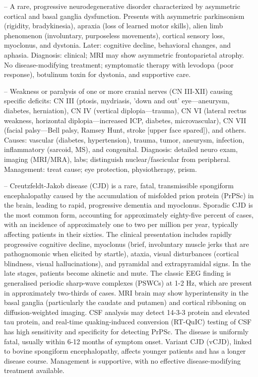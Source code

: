 -- A rare, progressive neurodegenerative disorder characterized by asymmetric cortical and basal ganglia dysfunction. Presents with asymmetric parkinsonism (rigidity, bradykinesia), apraxia (loss of learned motor skills), alien limb phenomenon (involuntary, purposeless movements), cortical sensory loss, myoclonus, and dystonia. Later: cognitive decline, behavioral changes, and aphasia. Diagnosis: clinical; MRI may show asymmetric frontoparietal atrophy. No disease-modifying treatment; symptomatic therapy with levodopa (poor response), botulinum toxin for dystonia, and supportive care.

-- Weakness or paralysis of one or more cranial nerves (CN III-XII) causing specific deficits: CN III (ptosis, mydriasis, 'down and out' eye—aneurysm, diabetes, herniation), CN IV (vertical diplopia—trauma), CN VI (lateral rectus weakness, horizontal diplopia—increased ICP, diabetes, microvascular), CN VII (facial palsy—Bell palsy, Ramsey Hunt, stroke [upper face spared]), and others. Causes: vascular (diabetes, hypertension), trauma, tumor, aneurysm, infection, inflammatory (sarcoid, MS), and congenital. Diagnosis: detailed neuro exam, imaging (MRI/MRA), labs; distinguish nuclear/fascicular from peripheral. Management: treat cause; eye protection, physiotherapy, prism.

-- Creutzfeldt-Jakob disease (CJD) is a rare, fatal, transmissible spongiform encephalopathy caused by the accumulation of misfolded prion protein (PrPSc) in the brain, leading to rapid, progressive dementia and myoclonus. Sporadic CJD is the most common form, accounting for approximately eighty-five percent of cases, with an incidence of approximately one to two per million per year, typically affecting patients in their sixties. The clinical presentation includes rapidly progressive cognitive decline, myoclonus (brief, involuntary muscle jerks that are pathognomonic when elicited by startle), ataxia, visual disturbances (cortical blindness, visual hallucinations), and pyramidal and extrapyramidal signs. In the late stages, patients become akinetic and mute. The classic EEG finding is generalised periodic sharp-wave complexes (PSWCs) at 1-2 Hz, which are present in approximately two-thirds of cases. MRI brain may show hyperintensity in the basal ganglia (particularly the caudate and putamen) and cortical ribboning on diffusion-weighted imaging. CSF analysis may detect 14-3-3 protein and elevated tau protein, and real-time quaking-induced conversion (RT-QuIC) testing of CSF has high sensitivity and specificity for detecting PrPSc. The disease is uniformly fatal, usually within 6-12 months of symptom onset. Variant CJD (vCJD), linked to bovine spongiform encephalopathy, affects younger patients and has a longer disease course. Management is supportive, with no effective disease-modifying treatment available.

